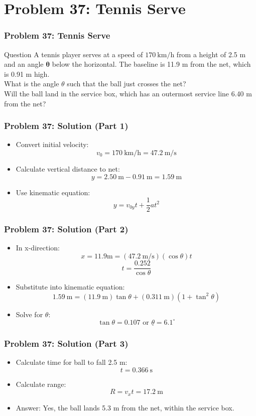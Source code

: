 \documentclass{beamer}
\begin{document}
\section{Problem 37: Tennis Serve}

\begin{frame}
\frametitle{Problem 37: Tennis Serve}
\begin{block}{Question}
A tennis player serves at a speed of $170 \mathrm{~km} / \mathrm{h}$ from a height of 2.5 m and an angle $\boldsymbol{\theta}$ below the horizontal. The baseline is 11.9 m from the net, which is 0.91 m high.\\
What is the angle $\theta$ such that the ball just crosses the net?\\
Will the ball land in the service box, which has an outermost service line 6.40 m from the net?
\end{block}
\end{frame}

\begin{frame}
\frametitle{Problem 37: Solution (Part 1)}
\begin{itemize}
    \item Convert initial velocity:
    $$v_{0}=170 \mathrm{~km} / \mathrm{h}=47.2 \mathrm{~m} / \mathrm{s}$$
    \item Calculate vertical distance to net:
    $$y=2.50 \mathrm{~m}-0.91 \mathrm{~m}=1.59 \mathrm{~m}$$
    \item Use kinematic equation:
    $$y=v_{0y} t+\frac{1}{2} a t^{2}$$
\end{itemize}
\end{frame}

\begin{frame}
\frametitle{Problem 37: Solution (Part 2)}
\begin{itemize}
    \item In x-direction:
    $$x=11.9 \mathrm{m}=(47.2 \mathrm{~m} / \mathrm{s})(\cos \theta) t$$
    $$t= \frac{0.252}{\cos \theta}$$
    \item Substitute into kinematic equation:
    $$1.59 \mathrm{~m}=(11.9 \mathrm{~m}) \tan \theta+(0.311 \mathrm{~m})(1+\tan ^{2} \theta)$$
    \item Solve for $\theta$:
    $$\tan \theta=0.107 \text{ or } \underline{\theta}=6.1^{\circ}$$
\end{itemize}
\end{frame}

\begin{frame}

\frametitle{Problem 37: Solution (Part 3)}
\begin{itemize}
    \item Calculate time for ball to fall 2.5 m:
    $$t=0.366 \mathrm{~s}$$
    \item Calculate range:
    $$R=v_{x} t= 17.2 \mathrm{~m}$$
    \item Answer: Yes, the ball lands 5.3 m from the net, within the service box.
\end{itemize}
\end{frame}
\end{document}
